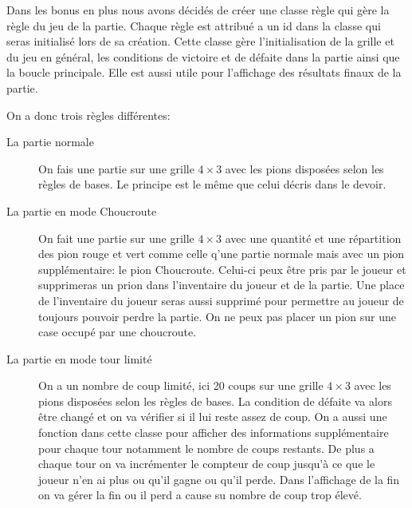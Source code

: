 Dans les bonus en plus nous avons décidés de créer une classe règle qui gère la règle du jeu de la partie. Chaque règle est attribué a un id dans la classe qui seras initialisé lors de sa création. Cette classe gère l’initialisation de la grille et du jeu en général, les conditions de victoire et de défaite dans la partie ainsi que la boucle principale. Elle est aussi utile pour l'affichage des résultats finaux de la partie.

On a donc trois règles différentes:
\begin{description}
\item[La partie normale] On fais une partie sur une grille $4\times 3$ avec les pions disposées selon les règles de bases. Le principe est le même que celui décris dans le devoir.

\item[La partie en mode Choucroute] On fait une partie sur une grille $4\times 3$ avec une quantité et une répartition des pion rouge et vert comme celle q'une partie normale mais avec un pion supplémentaire: le pion Choucroute. Celui-ci peux être pris par le joueur et supprimeras un prion dans l'inventaire du joueur et de la partie. Une place de l'inventaire du joueur seras aussi supprimé pour permettre au joueur de toujours pouvoir perdre la partie. On ne peux pas placer un pion sur une case occupé par une choucroute.

\item[La partie en mode tour limité] On a un nombre de coup limité, ici 20 coups  sur une grille $4\times 3$ avec les pions disposées selon les règles de bases. La condition de défaite va alors être changé et on va vérifier si il lui reste assez de coup. On a aussi une fonction dans cette classe pour afficher des informations supplémentaire pour chaque tour notamment le nombre de coups restants. De plus a chaque tour on va incrémenter le compteur de coup jusqu’à ce que le joueur n'en ai plus ou qu'il gagne ou qu'il perde. Dans l'affichage de la fin on va gérer la fin ou il perd a cause su nombre de coup trop élevé.
\end{description}